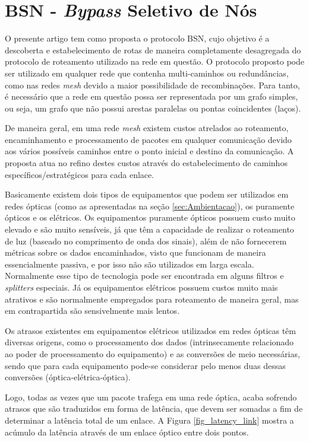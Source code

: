 \documentclass[12pt]{article}
\begin{document}
\section{BSN - \emph{Bypass} Seletivo de Nós}
\label{sec:proposta}
O presente artigo tem como proposta o protocolo BSN, cujo objetivo é a descoberta e estabelecimento de rotas de maneira completamente desagregada do protocolo de roteamento utilizado na rede em questão. O protocolo proposto pode ser utilizado em qualquer rede que contenha multi-caminhos ou redundâncias, como nas redes \emph{mesh} devido a maior possibilidade de recombinações. Para tanto, é necessário que a rede em questão possa ser representada por um grafo simples, ou seja, um grafo que não possui arestas paralelas ou pontas coincidentes (laços).

De maneira geral, em uma rede \emph{mesh} existem custos atrelados ao roteamento, encaminhamento e processamento de pacotes em qualquer comunicação devido aos vários possíveis caminhos entre o ponto inicial e destino da comunicação. A proposta atua no refino destes custos através do estabelecimento de caminhos específicos/estratégicos para cada enlace.

Basicamente existem dois tipos de equipamentos que podem ser utilizados em redes ópticas (como as apresentadas na seção \ref{sec:Ambientacao}), os puramente ópticos e os elétricos. Os equipamentos puramente ópticos possuem custo muito elevado e são muito sensíveis, já que têm a capacidade de realizar o roteamento de luz (baseado no comprimento de onda dos sinais), além de não fornecerem métricas sobre os dados encaminhados, visto que funcionam de maneira essencialmente passiva, e por isso não são utilizados em larga escala. Normalmente esse tipo de tecnologia pode ser encontrada em alguns filtros e \emph{splitters} especiais. Já os equipamentos elétricos possuem custos muito mais atrativos e são normalmente empregados para roteamento de maneira geral, mas em contrapartida são sensivelmente mais lentos.

Os atrasos existentes em equipamentos elétricos utilizados em redes ópticas têm diversas origens, como o processamento dos dados (intrinsecamente relacionado ao poder de processamento do equipamento) e as conversões de meio necessárias, sendo que para cada equipamento pode-se considerar pelo menos duas dessas conversões (óptica-elétrica-óptica). 

Logo, todas as vezes que um pacote trafega em uma rede óptica, acaba sofrendo atrasos que são traduzidos em forma de latência, que devem ser somadas a fim de determinar a latência total de um enlace. A Figura \ref{fig_latency_link} mostra a acúmulo da latência através de um enlace óptico entre dois pontos. 
\end{document}
